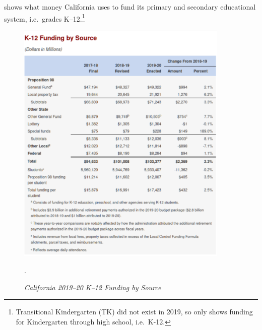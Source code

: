  shows what money California uses to fund its primary and secondary educational system, i.e.~grades K–12.\footnote{Transitional Kindergarten (TK) did not exist in 2019, so  only shows funding  for Kindergarten through high school, i.e.~K-12.}
\begin{figure}[hbt]
  \centering
  \caption[California 2019–20 K–12 Funding by Source]{\textit{California 2019–20 K–12 Funding by Source}}\label{fig:2019–20_K–12_Funding}
  \includegraphics[width=0.9\textwidth]{2019-20_K-12_Funding_by_Source.pdf}\\ %
  \footnotesize\raggedright\textcite{LAO2021}.
\end{figure}
